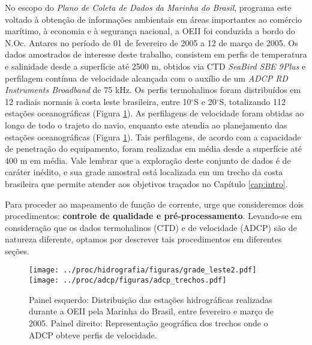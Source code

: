 \hspace{6mm} No escopo do {\it Plano de Coleta de Dados da Marinha do Brasil}, programa 
este voltado à obtenção de informações ambientais em áreas importantes ao comércio marítimo, 
à economia e à segurança nacional, a OEII foi conduzida a bordo do N.Oc. Antares no período 
de 01 de fevereiro de 2005 a 12 de março de 2005. Os dados amostrados de interesse deste
trabalho, consistem em perfis de temperatura e salinidade desde a superfície até 2500 m,
obtidos via CTD {\it SeaBird SBE 9Plus}
e perfilagem contínua de velocidade alcançada com o auxílio de um 
{\it ADCP RD Instruments Broadband} de 75 kHz. Os perfis termohalinos
foram distribuídos em 12 radiais normais à costa leste brasileira, entre 10$^\circ$S e 20$^\circ$S,
totalizando 112 estações oceanográficas (Figura \ref{fig:grade_leste2}). As perfilagens
de velocidade foram obtidas ao longo de todo o trajeto do navio, enquanto este 
atendia ao planejamento das estações oceanográficas (Figura \ref{fig:grade_leste2}).
Tais perfilagens, de acordo com a capacidade de penetração do equipamento, foram realizadas em média
desde a superfície até 400 m em média. Vale lembrar que a exploração deste
conjunto de dados é de caráter inédito, e sua grade amostral está localizada em um trecho
da costa brasileira que permite atender aos objetivos traçados no Capítulo \ref{cap:intro}.

Para proceder ao mapeamento de função de corrente, urge que consideremos dois procedimentos:
{\bf controle de qualidade e pré-processamento}.
Levando-se em con\-si\-de\-ra\-ção que os dados termohalinos (CTD) e de velocidade (ADCP) são de 
natureza diferente, optamos por descrever tais procedimentos em diferentes seções.

\begin{figure}
 \begin{center}
  \texttt{[image: ../proc/hidrografia/figuras/grade\_leste2.pdf]}
  \texttt{[image: ../proc/adcp/figuras/adcp\_trechos.pdf]}
 \end{center}
 \vspace{-.25cm}
 \renewcommand{\baselinestretch}{1}
 \caption{\label{fig:grade_leste2} \small Painel esquerdo: Distribuição das estações hidrográficas realizadas 
durante a OEII pela Marinha do Brasil, entre fevereiro e março de 2005. Painel direito: Representação geográfica
dos trechos onde o ADCP obteve perfis de velocidade.}
\end{figure}


